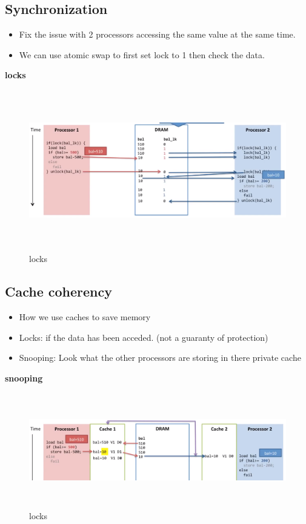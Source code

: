 \subsection{Synchronization}
\begin{itemize}
\item  Fix the issue with 2 processors accessing the same value at the same time.
\item  We can use atomic swap to first set lock to 1 then check the data.
\end{itemize}

\newpage

\textbf{locks}
\begin{figure}[h]
    \vspace{10mm}
    \centering
    \includegraphics[width=16cm, height=7cm]{image/locks.png}
    \caption{locks}
\end{figure}


\subsection{Cache coherency}
\begin{itemize}
\item  How we use caches to save memory
\item  Locks: if the data has been acceded. (not a guaranty of protection)
\item  Snooping: Look what the other processors are storing in there private cache   
\end{itemize}
  

\textbf{snooping}
\begin{figure}[h]
    \vspace{10mm}
    \centering
    \includegraphics[width=16cm, height=5cm]{image/snooping.png}
    \caption{locks}
\end{figure}

